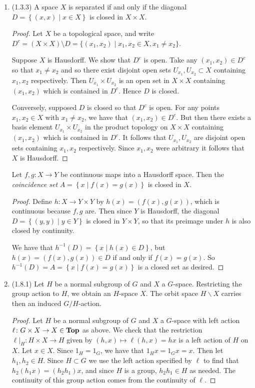 \documentclass[11pt]{article}
\newcommand{\cbr}[1]{\left\{#1\right\}}
\newcommand{\catname}[1]{{
  \textbf{#1}}}
\newcommand{\Top}{\catname{Top}}
\DeclarePairedDelimiter{\floor}{\lfloor}{\rfloor}
\begin{document}
\begin{enumerate}
\begin{proof}
      Similarly, the functor $R = \floor{\cdot}$ is a right adjoint of the inclusion map $i$ if for all $r\in\mathbb{R}$ and $z\in\mathbb{Z}$, we have $\mathbb{R}(z,r)\cong \mathbb{Z}(z,\floor r)$. Indeed, $z\leq r$ if and only if $z\leq \floor r$.
    \end{proof}
    \item (1.3.3) A space $X$ is separated if and only if the diagonal $D = \cbr{(x,x)\mid x\in X}$ is closed in $X\times X$. \begin{proof}
      Let $X$ be a topological space, and write $D^c = (X\times X)\setminus D = \{(x_1,x_2)\mid x_1,x_2\in X, x_1\neq x_2\}$.
      
      Suppose $X$ is Hausdorff. We show that $D^c$ is open. Take any $(x_1,x_2)\in D^c$ so that $x_1\neq x_2$ and so there exist disjoint open sets $U_{x_1},U_{x_2}\subset X$ containing $x_1,x_2$ respectively. Then $U_{x_1}\times U_{x_2}$ is an open set in $X\times X$ containing $(x_1,x_2)$ which is contained in $D^c$. Hence $D$ is closed.

      Conversely, supposed $D$ is closed so that $D^c$ is open. For any points $x_1,x_2\in X$ with $x_1\neq x_2$, we have that $(x_1,x_2)\in D^c$. But then there exists a basis element $U_{x_1}\times U_{x_2}$ in the product topology on $X\times X$ containing $(x_1,x_2)$ which is contained in $D^c$. It follows that $U_{x_1}, U_{x_2}$ are disjoint open sets containing $x_1,x_2$ respectively. Since $x_1,x_2$ were arbitrary it follows that $X$ is Hausdorff.
    \end{proof}
    
    Let $f,g\colon X\to Y$ be continuous maps into a Hausdorff space. Then the \textit{coincidence set} $A = \cbr{x\mid f(x) = g(x)}$ is closed in $X$. \begin{proof}
      Define $h\colon X\to Y\times Y$ by $h(x) = (f(x),g(x))$, which is continuous because $f,g$ are. Then since $Y$ is Hausdorff, the diagonal $D = \cbr{(y,y)\mid y\in Y}$ is closed in $Y\times Y$, so that its preimage under $h$ is also closed by continuity.

      We have that $h^{-1}(D) = \cbr{x\mid h(x)\in D}$, but $h(x) = (f(x),g(x))\in D$ if and only if $f(x) = g(x)$. So $h^{-1}(D) = A = \cbr{x\mid f(x) = g(x)}$ is a closed set as desired.
    \end{proof}
    \item (1.8.1) Let $H$ be a normal subgroup of $G$ and $X$ a $G$-space. Restricting the group action to $H$, we obtain an $H$-space $X$. The orbit space $H\backslash X$ carries then an induced $G/H$-action. \begin{proof}
      Let $H$ be a normal subgroup of $G$ and $X$ a $G$-space with left action $\ell\colon G\times X\to X\in \Top$ as above. We check that the restriction $\ell\vert_H\colon H\times X \to H$ given by $(h,x)\mapsto \ell(h,x) = hx$ is a left action of $H$ on $X$. Let $x\in X$. Since $1_H = 1_G$, we have that $1_Hx = 1_Gx = x$. Then let $h_1,h_2\in H$. Since $H\subset G$ we use the left action specified by $\ell$ to find that $h_2(h_1x) = (h_2h_1)x$, and since $H$ is a group, $h_2h_1\in H$ as needed. The continuity of this group action comes from the continuity of $\ell$.


\end{proof}
\end{enumerate}
\end{document}
